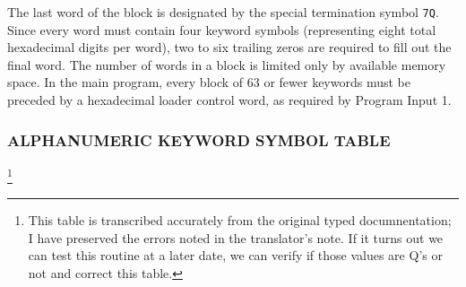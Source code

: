 The last word of the block is designated by the special termination symbol \texttt{7Q}. Since every word must contain four keyword symbols (representing eight total hexadecimal digits per word), two to six trailing zeros are required to fill out the final word. The number of words in a block is limited only by available memory space. In the main program, every block of 63 or fewer keywords must be preceded by a hexadecimal loader control word, as required by Program Input 1.

\subsubsection*{ALPHANUMERIC KEYWORD SYMBOL TABLE}\footnote{This table is transcribed accurately from the original typed documnentation; I have preserved the errors noted in the translator's note. If it turns out we can test this routine at a later date, we can verify if those values are Q's or not and correct this table.}
